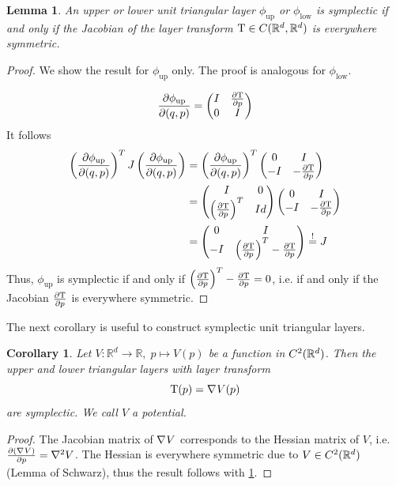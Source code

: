 \documentclass[twoside,a4paper]{article}
\newtheorem{corollary}{Corollary}
\newtheorem{lemma}{Lemma}
\begin{document}
\begin{lemma}\label{jacobi_symmetric}
	An upper or lower unit triangular layer $\phi_{\text{up}}$ or $\phi_{\text{low}}$
	is symplectic if and only if the Jacobian of the layer transform
	$\mathrm{T} \in C(\mathbb{R}^d, \mathbb{R}^d)$ 
	is everywhere symmetric.
\end{lemma}
\begin{proof}
	We show the result for $\phi_{\text{up}}$ only. 
	The proof is analogous for $\phi_{\text{low}}$.

	\begin{equation*}
		\frac{\partial \phi_{\text{up}}}{\partial (q,p)} = \begin{pmatrix}
			I & \frac{\partial \mathrm{T}}{\partial p} \\
			0 & I
		\end{pmatrix}
	\end{equation*}
	It follows
	\begin{align*}
		\left( \frac{\partial \phi_{\text{up}}}{\partial (q,p)} \right)^T J \left( \frac{\partial \phi_{\text{up}}}{\partial (q,p)} \right)
		&= \left( \frac{\partial \phi_{\text{up}}}{\partial (q,p)} \right)^T \begin{pmatrix}
			0 & I \\
			-I & -\frac{\partial \mathrm{T}}{\partial p}
		\end{pmatrix} \\
		&= \begin{pmatrix}
			I & 0 \\
			\left( \frac{\partial \mathrm{T}}{\partial p} \right)^T & Id
		\end{pmatrix} \begin{pmatrix}
			0 & I \\
			-I & -\frac{\partial \mathrm{T}}{\partial p}
		\end{pmatrix} \\
		&= \begin{pmatrix}
			0 & I \\
			-I & \left( \frac{\partial \mathrm{T}}{\partial p} \right) ^T-\frac{\partial \mathrm{T}}{\partial p}
		\end{pmatrix} \overset{!}{=} J
	\end{align*}
	Thus, $\phi_{\text{up}}$ is symplectic if and only if
	$\left( \frac{\partial \mathrm{T}}{\partial p} \right) ^T-\frac{\partial \mathrm{T}}{\partial p}=0$, 
	i.e. if and only if the Jacobian $\frac{\partial \mathrm{T}}{\partial p}$ is everywhere symmetric.
\end{proof}

The next corollary is useful to construct symplectic unit triangular layers.
\begin{corollary}\label{gradient_corollary}
	Let $V: \mathbb{R}^d \to \mathbb{R}, \; p \mapsto V(p)$ be a function in 
	$C^2(\mathbb{R}^d)$. Then the upper and lower triangular layers with layer transform
	\begin{equation*}
		\mathrm{T}(p) = \nabla_{}{V}(p)
	\end{equation*}
	are symplectic. We call $V$ a potential.
\end{corollary}
\begin{proof}
	The Jacobian matrix of $\nabla_{}{V}$ corresponds to the Hessian matrix of $V$,
	i.e. $\frac{\partial (\nabla_{}{V})}{\partial p} =\nabla^2 V$.
	The Hessian is everywhere symmetric due to $V \in C^2(\mathbb{R}^d)$ (Lemma of Schwarz),
	thus the result follows with \cref{jacobi_symmetric}.
\end{proof}
\end{document}
